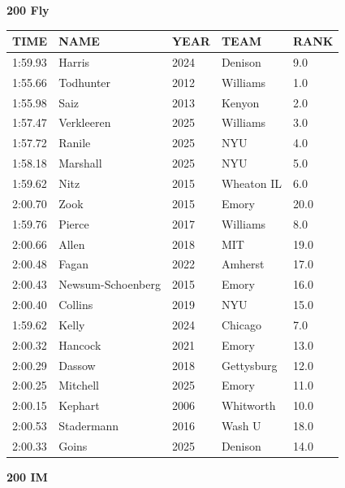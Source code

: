 \begin{table}[H]
\centering
\begin{minipage}[t]{0.48\textwidth}
\centering
\textbf{200 Fly}\\[0.1cm]
\begin{tabular}{@{}p{1.8cm}p{2.8cm}p{1.2cm}p{1.4cm}p{0.8cm}@{}}
\hline
    \textbf{TIME} & \textbf{NAME} & \textbf{YEAR} & \textbf{TEAM} & \textbf{RANK} \\
\hline
    1:59.93 & Harris & 2024 & Denison & 9.0 \\
    1:55.66 & Todhunter & 2012 & Williams & 1.0 \\
    1:55.98 & Saiz & 2013 & Kenyon & 2.0 \\
    1:57.47 & Verkleeren & 2025 & Williams & 3.0 \\
    1:57.72 & Ranile & 2025 & NYU & 4.0 \\
    1:58.18 & Marshall & 2025 & NYU & 5.0 \\
    1:59.62 & Nitz & 2015 & Wheaton IL & 6.0 \\
    2:00.70 & Zook & 2015 & Emory & 20.0 \\
    1:59.76 & Pierce & 2017 & Williams & 8.0 \\
    2:00.66 & Allen & 2018 & MIT & 19.0 \\
    2:00.48 & Fagan & 2022 & Amherst & 17.0 \\
    2:00.43 & Newsum-Schoenberg & 2015 & Emory & 16.0 \\
    2:00.40 & Collins & 2019 & NYU & 15.0 \\
    1:59.62 & Kelly & 2024 & Chicago & 7.0 \\
    2:00.32 & Hancock & 2021 & Emory & 13.0 \\
    2:00.29 & Dassow & 2018 & Gettysburg & 12.0 \\
    2:00.25 & Mitchell & 2025 & Emory & 11.0 \\
    2:00.15 & Kephart & 2006 & Whitworth & 10.0 \\
    2:00.53 & Stadermann & 2016 & Wash U & 18.0 \\
    2:00.33 & Goins & 2025 & Denison & 14.0 \\
\hline
\end{tabular}
\end{minipage}\hfill
\begin{minipage}[t]{0.48\textwidth}
\centering
\textbf{200 IM}\\[0.1cm]
\begin{tabular}{@{}p{1.8cm}p{2.8cm}p{1.2cm}p{1.4cm}p{0.8cm}@{}}

\end{tabular}
\end{minipage}
\end{table}
